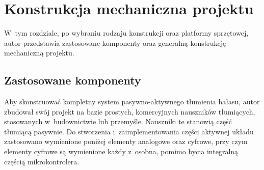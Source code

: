 \chapter{Konstrukcja mechaniczna projektu}
\label{cha:constr}
W~tym rozdziale, po wybraniu rodzaju konstrukcji oraz platformy sprzętowej, autor przedstawia zastosowane komponenty oraz generalną konstrukcję mechaniczną projektu.
\section{Zastosowane komponenty}
\label{sec:komponenty}
Aby skonstruować kompletny system pasywno-aktywnego tłumienia hałasu, autor zbudował swój projekt na bazie prostych, komercyjnych nauszników tłumiących, stosowanych w~budownictwie lub przemyśle. Nauszniki te stanowią część tłumiącą pasywnie. Do stworzenia i~zaimplementowania części aktywnej układu zastosowano wymienione poniżej elementy analogowe oraz cyfrowe, przy czym elementy cyfrowe są wymienione każdy z~osobna, pomimo bycia integralną częścią mikrokontrolera.
